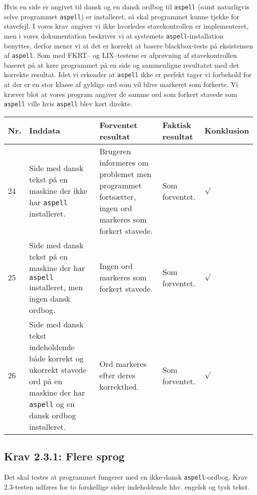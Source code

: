 \documentclass[a4paper,oneside,article]{memoir}
\begin{document}
\begin{landscape}
Hvis en side er angivet til dansk og en dansk ordbog til
\texttt{aspell} (samt naturligvis selve programmet \texttt{aspell}) er
installeret, så skal programmet kunne tjekke for stavefejl. I vores
krav angiver vi ikke hvorledes stavekontrollen er implementeret, men i
vores dokumentation beskriver vi at systemets
\texttt{aspell}-installation benyttes, derfor mener vi at det er
korrekt at basere blackbox-tests på eksistensen af
\texttt{aspell}. Som med FKRT-- og LIX--testene er afprøvning af
stavekontrollen baseret på at køre programmet på en side og
sammenligne resultatet med det korrekte resultat. Idet vi erkender at
\texttt{aspell} ikke er perfekt tager vi forbehold for at der er en
stor klasse af gyldige ord som vil blive markeret som forkerte. Vi
kræver blot at vores program angiver de samme ord som forkert stavede
som \texttt{aspell} ville hvis \texttt{aspell} blev kørt direkte.

\begin{longtable}[c]{p{20pt}|p{220pt}|p{130pt}|p{130pt}|p{50pt}}
\textbf{Nr.} &
\textbf{Inddata} &
\textbf{Forventet resultat} &
\textbf{Faktisk resultat} &
\textbf{Konklusion} \\ \hline

24 &
Side med dansk tekst på en maskine der ikke har \texttt{aspell}
installeret. &
Brugeren informeres om problemet men programmet fortsætter, ingen ord
markeres som forkert stavede. &
Som forventet. &
$\surd$ \\ \hline

25 &
Side med dansk tekst på en maskine der har \texttt{aspell}
installeret, men ingen dansk ordbog. &
Ingen ord markeres som forkert stavede. &
Som forventet. &
$\surd$ \\ \hline

26 &
Side med dansk tekst indeholdende både korrekt og ukorrekt stavede ord
på en maskine der har \texttt{aspell}
og en dansk ordbog installeret. &
Ord markeres efter deres korrekthed. &
Som forventet. &
$\surd$ \\ \hline

\end{longtable}

\subsection{Krav 2.3.1: Flere sprog}

Det skal testes at programmet fungerer med en ikke-dansk
\texttt{aspell}-ordbog. Krav 2.3-testen udføres for to forskellige
sider indeholdende hhv. engelsk og tysk tekst.


\end{landscape}
\end{document}
